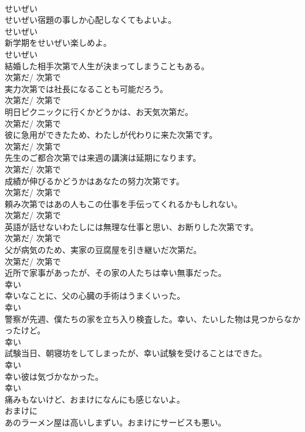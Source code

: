 \documentclass[8pt]{extreport}
\begin{document}
\begin{CJK}{UTF8}{min}
\\	せいぜい
\\	せいぜい宿題の事しか心配しなくてもよいよ。	
\\	せいぜい
\\	新学期をせいぜい楽しめよ。	
\\	せいぜい
\\	結婚した相手次第で人生が決まってしまうこともある。	
\\	次第だ/ 次第で
\\	実力次第では社長になることも可能だろう。	
\\	次第だ/ 次第で
\\	明日ピクニックに行くかどうかは、お天気次第だ。	
\\	次第だ/ 次第で
\\	彼に急用ができたため、わたしが代わりに来た次第です。	
\\	次第だ/ 次第で
\\	先生のご都合次第では来週の講演は延期になります。	
\\	次第だ/ 次第で
\\	成績が伸びるかどうかはあなたの努力次第です。	
\\	次第だ/ 次第で
\\	頼み次第ではあの人もこの仕事を手伝ってくれるかもしれない。	
\\	次第だ/ 次第で
\\	英語が話せないわたしには無理な仕事と思い、お断りした次第です。	
\\	次第だ/ 次第で
\\	父が病気のため、実家の豆腐屋を引き継いだ次第だ。	
\\	次第だ/ 次第で
\\	近所で家事があったが、その家の人たちは幸い無事だった。	
\\	幸い
\\	幸いなことに、父の心臓の手術はうまくいった。	
\\	幸い
\\	警察が先週、僕たちの家を立ち入り検査した。幸い、たいした物は見つからなかったけど。	
\\	幸い
\\	試験当日、朝寝坊をしてしまったが、幸い試験を受けることはできた。	
\\	幸い
\\	幸い彼は気づかなかった。	
\\	幸い
\\	痛みもないけど、おまけになんにも感じないよ。	
\\	おまけに
\\	あのラーメン屋は高いしまずい。おまけにサービスも悪い。	

\end{CJK}
\end{document}
